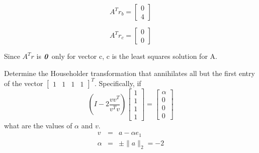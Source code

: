 \documentclass{jhwhw}
\begin{document}
\[
A^Tr_b = 
\begin{bmatrix}
  0 \\
  4
\end{bmatrix}
\]

\[
A^Tr_c = 
\begin{bmatrix}
  0 \\
  0
\end{bmatrix}
\]

Since \(A^Tr\) is \(\textbf{\textit{0}}\) only for vector c, c is the least squares
solution for A.

Determine the Householder transformation that annihilates all but the first entry of the
vector \(
\begin{bmatrix}
  1 &
  1 &
  1 &
  1
\end{bmatrix}^T
\). Specifically, if 
\[
\left(I - 2\frac{vv^T}{v^Tv}\right)
\begin{bmatrix}
  1 \\
  1 \\
  1 \\
  1
\end{bmatrix}
=
\begin{bmatrix}
  \alpha \\
  0 \\
  0 \\
  0
\end{bmatrix}
\]
what are the values of $\alpha$ and $v$.
\solution
\begin{eqnarray*}
  v &=& a - \alpha e_1 \\
  \alpha &=& \pm \| a \|_2 = -2
\end{eqnarray*}
\end{document}
